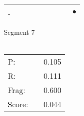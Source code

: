 \documentclass[landscape]{article}
\newcommand{\ssp}{\hspace{2pt}}
\newcommand{\mex}{\cellcolor{g}$\bullet$}
\begin{document}
\begin{tabular}{|l|p{10pt}|p{10pt}|p{10pt}|p{10pt}|p{10pt}|p{10pt}|p{10pt}|p{10pt}|}
\hline
\ssp \cellcolor{ref7}. \ssp&\hspace{2pt}&\hspace{2pt}&\hspace{2pt}&\hspace{2pt}&\hspace{2pt}&\hspace{2pt}&\hspace{2pt}&\hspace{2pt}\mex\\
\hline
\end{tabular}

\vspace{6pt}
\noindent Segment 7\\\\
\noindent\begin{tabular}{lm{12pt}r}
\hline
P:&&0.105\\
R:&&0.111\\
Frag:&&0.600\\
Score:&&0.044\\
\end{tabular}

\newpage
\end{document}

